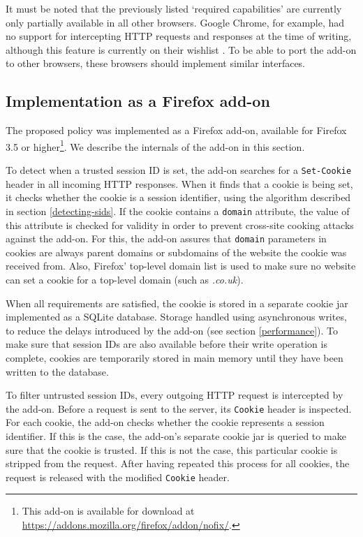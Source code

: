 It must be noted that the previously listed `required capabilities' are currently only partially available in all other browsers. Google Chrome, for example, had no support for intercepting HTTP requests and responses at the time of writing, although this feature is currently on their wishlist \cite{ChromiumWishlist}. To be able to port the add-on to other browsers, these browsers should implement similar interfaces.

\subsection{Implementation as a Firefox add-on}

The proposed policy was implemented as a Firefox add-on, available for Firefox 3.5 or higher\footnote{This add-on is available for download at \url{https://addons.mozilla.org/firefox/addon/nofix/}.}. We describe the internals of the add-on in this section.

To detect when a trusted session ID is set, the add-on searches for a \texttt{Set-Cookie} header in all incoming HTTP responses. When it finds that a cookie is being set, it checks whether the cookie is a session identifier, using the algorithm described in section \ref{detecting-sids}. If the cookie contains a \texttt{domain} attribute, the value of this attribute is checked for validity in order to prevent cross-site cooking attacks \cite{Zalewski2006} against the add-on. For this, the add-on assures that \texttt{domain} parameters in cookies are always parent domains or subdomains of the website the cookie was received from. Also, Firefox' top-level domain list \cite{MozillaDevelopers2010} is used to make sure no website can set a cookie for a top-level domain (such as \emph{.co.uk}).

When all requirements are satisfied, the cookie is stored in a separate cookie jar implemented as a SQLite database. Storage handled using asynchronous writes, to reduce the delays introduced by the add-on (see section \ref{performance}). To make sure that session IDs are also available before their write operation is complete, cookies are temporarily stored in main memory until they have been written to the database.

To filter untrusted session IDs, every outgoing HTTP request is intercepted by the add-on. Before a request is sent to the server, its \texttt{Cookie} header is inspected. For each cookie, the add-on checks whether the cookie represents a session identifier. If this is the case, the add-on's separate cookie jar is queried to make sure that the cookie is trusted. If this is not the case, this particular cookie is stripped from the request. After having repeated this process for all cookies, the request is released with the modified \texttt{Cookie} header.

